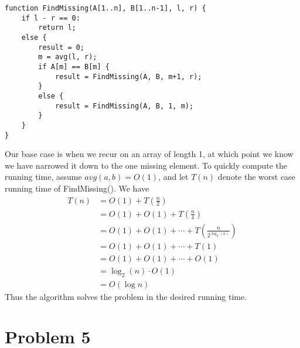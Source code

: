 \documentclass{article}
\begin{document}
\begin{verbatim}
function FindMissing(A[1..n], B[1..n-1], l, r) {
    if l - r == 0:
        return l;
    else {
        result = 0;
        m = avg(l, r);
        if A[m] == B[m] {
            result = FindMissing(A, B, m+1, r);
        }
        else {
            result = FindMissing(A, B, 1, m);
        }
    }
}
\end{verbatim}
Our base case is when we recur on an array of length 1, at which point
we know we have narrowed it down to the one missing element. To quickly
compute the running time, assume $avg(a,b) = O(1)$, and let $T(n)$ denote
the worst case running time of FindMissing(). We have
\begin{align*}
    T(n) &= O(1) + T\left(\frac{n}{2}\right)\\
    &= O(1) + O(1) + T\left(\frac{n}{4}\right)\\
    &= O(1) + O(1) + \cdots + T\left(\frac{n}{2^{\log_2(n)}}\right)\\
    &= O(1) + O(1) + \cdots + T(1)\\
    &= O(1) + O(1) + \cdots + O(1)\\
    &= \log_2(n) \cdot O(1) \\
    &= O(\log n)
\end{align*}
Thus the algorithm solves the problem in the desired running time.


\section*{Problem 5}
\end{document}
